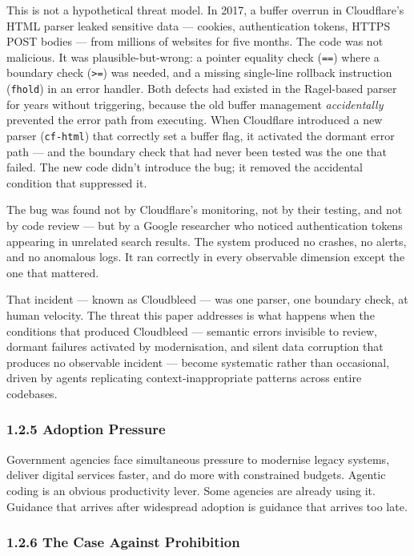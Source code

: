 \documentclass[a4paper,11pt]{report}
\begin{document}
This is not a hypothetical threat model. In 2017, a buffer overrun in
Cloudflare's HTML parser leaked sensitive data --- cookies,
authentication tokens, HTTPS POST bodies --- from millions of websites
for five months. The code was not malicious. It was plausible-but-wrong:
a pointer equality check (\texttt{==}) where a boundary check
(\texttt{\textgreater{}=}) was needed, and a missing single-line
rollback instruction (\texttt{fhold}) in an error handler. Both defects
had existed in the Ragel-based parser for years without triggering,
because the old buffer management \emph{accidentally} prevented the
error path from executing. When Cloudflare introduced a new parser
(\texttt{cf-html}) that correctly set a buffer flag, it activated the
dormant error path --- and the boundary check that had never been tested
was the one that failed. The new code didn't introduce the bug; it
removed the accidental condition that suppressed it.

The bug was found not by Cloudflare's monitoring, not by their testing,
and not by code review --- but by a Google researcher who noticed
authentication tokens appearing in unrelated search results. The system
produced no crashes, no alerts, and no anomalous logs. It ran correctly
in every observable dimension except the one that mattered.

That incident --- known as Cloudbleed --- was one parser, one boundary
check, at human velocity. The threat this paper addresses is what
happens when the conditions that produced Cloudbleed --- semantic errors
invisible to review, dormant failures activated by modernisation, and
silent data corruption that produces no observable incident --- become
systematic rather than occasional, driven by agents replicating
context-inappropriate patterns across entire codebases.

\hypertarget{adoption-pressure}{%
\subsubsection{1.2.5 Adoption Pressure}\label{adoption-pressure}}

Government agencies face simultaneous pressure to modernise legacy
systems, deliver digital services faster, and do more with constrained
budgets. Agentic coding is an obvious productivity lever. Some agencies
are already using it. Guidance that arrives after widespread adoption is
guidance that arrives too late.

\hypertarget{the-case-against-prohibition}{%
\subsubsection{1.2.6 The Case Against
Prohibition}\label{the-case-against-prohibition}}
\end{document}
